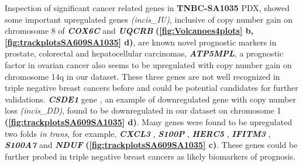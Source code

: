  Inspection of significant cancer related genes in \textbf{TNBC-SA1035} PDX, showed some important upregulated genes \textit{(incis\_IU)}, inclusive of  copy number gain on chromosome 8 of \textit{\textbf{COX6C}} \cite{yang2018overexpression,chang2017estrogen} and 
 \textit{\textbf{UQCRB}} \cite{kim2017mitochondrial,park2017mitochondrial} \textbf{(\autoref{fig:Volcanoes4plots} b, \autoref{fig:trackplotsSA609SA1035} d)}, are known novel prognostic markers in prostate, colorectal and hepatocellular carcinomas, \textit{\textbf{ATP5MPL}}, a prognostic factor in ovarian cancer also seems to be upregulated with copy number gain on chromosome 14q in our dataset. These three genes are not well recognized in triple negative breast cancers before and could be potential candidates for further validations. \textit{\textbf{CSDE1} } gene \cite{martinez2019unr}, an example of downregulated gene with copy number loss \textit{(incis\_DD)}, found to be downregulated in our dataset on chromosome 1 \textbf{(\autoref{fig:trackplotsSA609SA1035} d)}.
 Many genes were found to be upregulated two folds \textit{in trans}, for example, \textit{\textbf{CXCL3} }\cite{gui2016overexpression, karin2020cxcr3}, \textit{\textbf{S100P}} \cite{arumugam2011s100p,cong2020calcium}, 
\textit{\textbf{HERC5}} \cite{wrage2015identification}, 
\textit{\textbf{IFITM3}} \cite{liu2019ifitm3}, \textit{\textbf{S100A7}} 
\cite{zhang2019clinical, mayama2018olfm} and \textit{\textbf{NDUF}} 
\cite{li2015down} \textbf{(\autoref{fig:trackplotsSA609SA1035} c)}. These genes could be further probed in triple negative breast cancers as likely biomarkers of prognosis.


